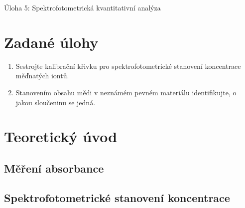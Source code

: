 \documentclass[13pt, a4paper, twoside]{article}
\begin{document}
    \begin{center}
        \Huge
        Úloha 5: Spektrofotometrická kvantitativní analýza
    \end{center}
    \onehalfspacing \large
    \section*{Zadané úlohy}
    \begin{enumerate}
        \item Sestrojte kalibrační křivku pro spektrofotometrické stanovení koncentrace měďnatých
        iontů.
        \item Stanovením obsahu mědi v neznámém pevném materiálu identifikujte, o jakou sloučeninu
        se jedná.
    \end{enumerate}
    \section*{Teoretický úvod}
    \subsection*{Měření absorbance}
    
    \subsection*{Spektrofotometrické stanovení koncentrace}
\end{document}
